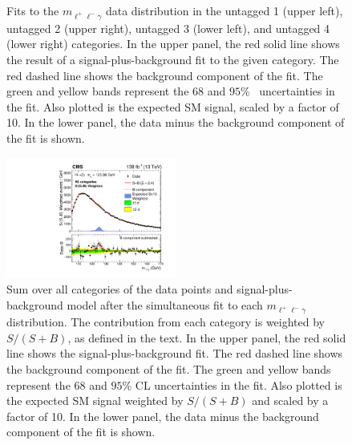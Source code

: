 \begin{figure}
   \caption{Fits to the $m_{\ell^+\ell^-\gamma}$ data distribution
    in the untagged 1 (upper left), untagged 2 (upper right), untagged 3 (lower left), and
  untagged 4 (lower right) categories.
  In the upper panel, the red solid line shows the result of a signal-plus-background fit to the given category.
  The red dashed line shows the background component of the fit.
  The green and yellow bands represent the $68$ and $95$\% \CL\ uncertainties in the fit.
  Also plotted is the expected SM signal, scaled by a factor of 10.
  In the lower panel, the data minus the background component of the fit is shown. \label{fig:4}}
  \end{figure}

\begin{figure}
\centering
\includegraphics[width=0.5\textwidth]{fig/results/Figure_012.pdf}
 \caption{Sum over all categories of the data points and signal-plus-background model after the simultaneous fit to each $m_{\ell^+\ell^-\gamma}$ distribution. 
 The contribution from each category is weighted by $S/(S+B)$, as defined in the text. 
 In the upper panel, the red solid line shows the signal-plus-background fit. The red dashed line shows the background component of the fit. The green and yellow bands represent the $68$ and $95$\% CL uncertainties in the fit. Also plotted is the expected SM signal weighted by $S/(S+B)$ and scaled by a factor of 10. In the lower panel, the data minus the background component of the fit is shown.
   }
\label{fig:SignalBackground}
\end{figure}

